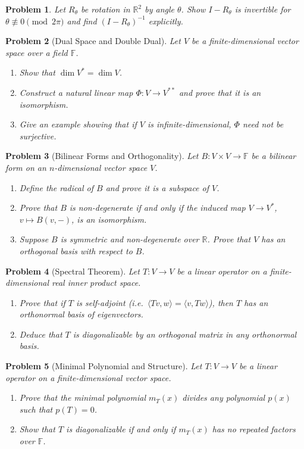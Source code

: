 \documentclass[11pt]{article}
\theoremstyle{upright}
\newtheorem{problem}{Problem}
\begin{document}
\begin{problem}
Let $R_\theta$ be rotation in $\mathbb{R}^2$ by angle $\theta$. Show $I-R_\theta$ is invertible for $\theta\not\equiv 0\pmod{2\pi}$ and find $(I-R_\theta)^{-1}$ explicitly.
\end{problem}
\begin{problem}[Dual Space and Double Dual]
Let $V$ be a finite-dimensional vector space over a field $\mathbb{F}$.
\begin{enumerate}
    \item Show that $\dim V^* = \dim V$.
    \item Construct a natural linear map $\Phi: V \to V^{**}$ and prove that it is an isomorphism.
    \item Give an example showing that if $V$ is infinite-dimensional, $\Phi$ need not be surjective.
\end{enumerate}
\end{problem}

\begin{problem}[Bilinear Forms and Orthogonality]
Let $B: V \times V \to \mathbb{F}$ be a bilinear form on an $n$-dimensional vector space $V$.
\begin{enumerate}
    \item Define the radical of $B$ and prove it is a subspace of $V$.
    \item Prove that $B$ is non-degenerate if and only if the induced map $V \to V^*$, $v \mapsto B(v, -)$, is an isomorphism.
    \item Suppose $B$ is symmetric and non-degenerate over $\mathbb{R}$. Prove that $V$ has an orthogonal basis with respect to $B$.
\end{enumerate}
\end{problem}

\begin{problem}[Spectral Theorem]
Let $T: V \to V$ be a linear operator on a finite-dimensional real inner product space.
\begin{enumerate}
    \item Prove that if $T$ is self-adjoint (i.e.\ $\langle T v, w \rangle = \langle v, T w \rangle$), then $T$ has an orthonormal basis of eigenvectors.
    \item Deduce that $T$ is diagonalizable by an orthogonal matrix in any orthonormal basis.
\end{enumerate}
\end{problem}

\begin{problem}[Minimal Polynomial and Structure]
Let $T: V \to V$ be a linear operator on a finite-dimensional vector space.
\begin{enumerate}
    \item Prove that the minimal polynomial $m_T(x)$ divides any polynomial $p(x)$ such that $p(T) = 0$.
    \item Show that $T$ is diagonalizable if and only if $m_T(x)$ has no repeated factors over $\mathbb{F}$.
\end{enumerate}
\end{problem}
\end{document}

